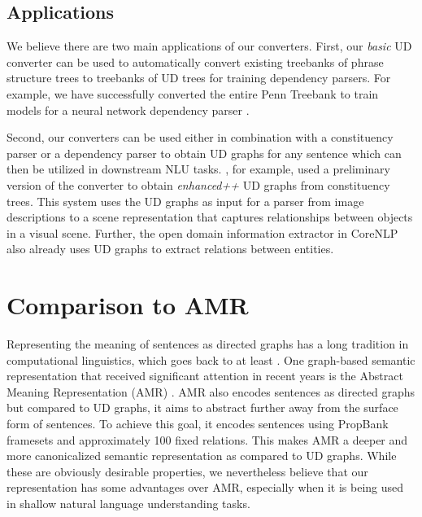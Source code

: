 \documentclass[10pt, a4paper]{article}
\begin{document}
\subsection{Applications}

We believe there are two main applications of our converters. First, our \textit{basic} UD converter 
can be used to automatically convert existing treebanks of phrase structure trees to treebanks of 
UD trees for training dependency parsers. For example, we have successfully converted the entire Penn Treebank \cite{marcus1993building}
to train models for a neural network dependency parser \cite{chen2014fast}.

Second, our converters can be used either in combination with a constituency parser or a dependency parser to obtain 
UD graphs for any sentence which can then be utilized in downstream NLU tasks. , for example,
used a preliminary version of the converter to obtain \textit{enhanced++} UD graphs from constituency trees. 
This system uses the UD graphs as input for a parser from image descriptions to a scene representation
that captures relationships between objects in a visual scene. Further, the open domain information
extractor in CoreNLP \cite{angeli2015leveraging} also already uses UD graphs to extract relations between entities.




\section{Comparison to AMR}

Representing the meaning of sentences as directed graphs has a long tradition in computational linguistics, which goes back to at least . One graph-based semantic representation that received significant attention in recent years is the Abstract Meaning Representation (AMR) \cite{banarescu2013abstract}.  AMR also encodes sentences as directed graphs but compared to UD graphs, it aims to abstract further away from the surface form of sentences. To achieve this goal, it encodes sentences using PropBank framesets \cite{palmer2005proposition} and approximately 100 fixed relations. This makes AMR a deeper and more canonicalized semantic representation as compared to UD graphs. While these are obviously desirable properties, we nevertheless believe that our representation has some advantages over AMR, especially when it is being used in shallow natural language understanding tasks.
\end{document}
